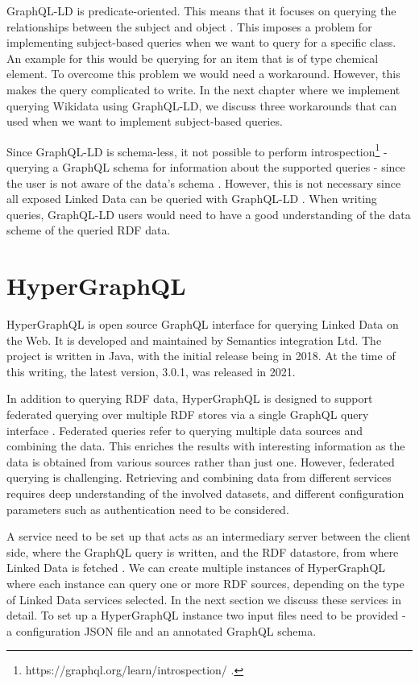 GraphQL-LD is predicate-oriented. This means that it focuses on querying the relationships between the subject and object \cite{Werbrouck2019a}. This imposes a problem for implementing subject-based queries when we want to query for a specific class. An example for this would be querying for an item that is of type chemical element. To overcome this problem we would need a workaround. However, this makes the query complicated to write. In the next chapter where we implement querying Wikidata using GraphQL-LD, we discuss three workarounds that can used when we want to implement subject-based queries. 

Since GraphQL-LD is schema-less, it not possible to perform introspection\footnote{https://graphql.org/learn/introspection/ .} -  querying a GraphQL schema for information about the supported queries - since the user is not aware of the data's schema \cite{Gleim2020}. However, this is not necessary since all exposed Linked Data can be queried with GraphQL-LD \cite{Werbrouck2019a}. When writing queries, GraphQL-LD users would need to have a good understanding of the data scheme of the queried RDF data.  


\section{HyperGraphQL}

HyperGraphQL is open source GraphQL interface for querying Linked Data on the Web. It is developed and maintained by Semantics integration Ltd. The project is written in Java, with the initial release being in 2018. At the time of this writing, the latest version, 3.0.1, was released in 2021.

In addition to querying RDF data, HyperGraphQL is designed to support federated querying over multiple RDF stores via a single GraphQL query interface \cite{Taelman2019}. Federated queries refer to querying multiple data sources and combining the data. This enriches the results with interesting information as the data is obtained from various sources rather than just one. However, federated querying is challenging. Retrieving and combining data from different services requires deep understanding of the involved datasets, and different configuration parameters such as authentication need to be considered. 

A service need to be set up that acts as an intermediary server between the client side, where the GraphQL query is written, and the RDF datastore, from where Linked Data is fetched \cite{Taelman2018} . We can create multiple instances of HyperGraphQL where each instance can query one or more RDF sources, depending on the type of Linked Data services selected. In the next section we discuss these services in detail. To set up a HyperGraphQL instance two input files need to be provided - a configuration JSON file and an annotated GraphQL schema.

